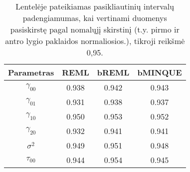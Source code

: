 \documentclass[12pt,a4paper]{article}
\begin{document}
\begin{small}
\begin{table}[H]
\label{table:ci1}
\centering
\begin{tabular}{c|ccc}
\hline
Parametras & REML & bREML & bMINQUE\\
\hline
$\gamma_{00}$ &0.938&0.942&0.943\\
$\gamma_{01}$ &0.931&0.938&0.937\\
$\gamma_{10}$ &0.950&0.953&0.952\\
$\gamma_{20}$ &0.932&0.941&0.941\\
$\sigma^2$ &0.949&0.951&0.948\\
$\tau_{00}$&0.944&0.954&0.945\\
\hline
\end{tabular}
\caption{Lentelėje pateikiamas pasikliautinių intervalų padengiamumas, kai vertinami duomenys pasiskirstę pagal nomalųjį skirstinį (t.y. pirmo ir antro lygio paklaidos normaliosios.), tikroji reikšmė 0,95.}
\end{table}
\end{small}
\end{document}
